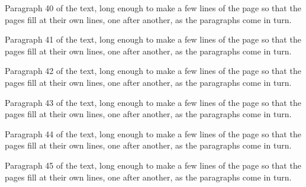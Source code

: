 \documentclass{article}
\begin{document}
Paragraph 40 of the text, long enough to make a few lines of the page so that the
pages fill at their own lines, one after another, as the paragraphs come in turn.

Paragraph 41 of the text, long enough to make a few lines of the page so that the
pages fill at their own lines, one after another, as the paragraphs come in turn.

Paragraph 42 of the text, long enough to make a few lines of the page so that the
pages fill at their own lines, one after another, as the paragraphs come in turn.

Paragraph 43 of the text, long enough to make a few lines of the page so that the
pages fill at their own lines, one after another, as the paragraphs come in turn.

Paragraph 44 of the text, long enough to make a few lines of the page so that the
pages fill at their own lines, one after another, as the paragraphs come in turn.

Paragraph 45 of the text, long enough to make a few lines of the page so that the
pages fill at their own lines, one after another, as the paragraphs come in turn.
\end{document}
